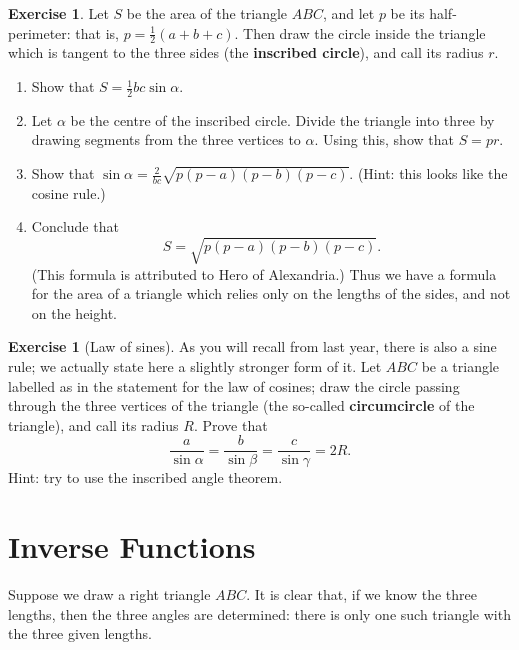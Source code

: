 \documentclass[a4paper,leqno]{article}
\numberwithin{equation}{section}
\theoremstyle{definition}
\newtheorem{exercise}[equation]{Exercise}
\theoremstyle{remark}
\newcommand{\df}[1]{\textbf{#1}}
\begin{document}
\begin{exercise}
  Let $ S $ be the area of the triangle $ ABC $, and let $ p $ be its half-perimeter: that is, $ p = \frac{1}{2}(a + b + c) $. Then draw
  the circle inside the triangle which is tangent to the three sides (the \df{inscribed circle}), and call its radius $ r $.
  \begin{enumerate}
    \item Show that $ S = \frac{1}{2} bc \sin \alpha $.
    \item Let $ \alpha $ be the centre of the inscribed circle. Divide the triangle into three by drawing segments
          from the three vertices to $ \alpha $. Using this, show that $ S = pr $.
    \item Show that $ \sin \alpha = \frac{2}{bc}\sqrt{p(p-a)(p-b)(p-c)} $. (Hint: this looks like the cosine rule.)
    \item Conclude that
          \begin{displaymath}
            S = \sqrt{p(p-a)(p-b)(p-c)}.
          \end{displaymath}
          (This formula is attributed to Hero of Alexandria.) Thus we have a formula for the area of a triangle which
          relies only on the lengths of the sides, and not on the height.
  \end{enumerate}
\end{exercise}

\begin{exercise}[Law of sines]
  As you will recall from last year, there is also a sine rule; we actually state here a slightly stronger
  form of it. Let $ ABC $ be a triangle labelled as in the statement for the law of cosines; draw the circle passing
  through the three vertices of the triangle (the so-called \df{circumcircle} of the triangle), and call its
  radius $ R $. Prove that
  \begin{displaymath}
    \frac{a}{\sin \alpha} = \frac{b}{\sin \beta} = \frac{c}{\sin \gamma} = 2R.
  \end{displaymath}
  Hint: try to use the inscribed angle theorem.
\end{exercise}

\section{Inverse Functions}
Suppose we draw a right triangle $ ABC $. It is clear that, if we know the three lengths, then the three angles are determined: there
is only one such triangle with the three given lengths.
\end{document}
